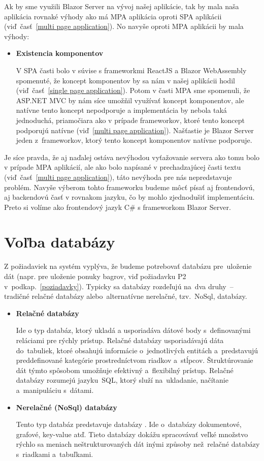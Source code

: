 Ak by sme využili Blazor Server na vývoj našej aplikácie, tak by mala naša aplikácia rovnaké výhody ako má MPA aplikácia oproti SPA aplikácii (viď~časť~\ref{multi page application}). No navyše oproti MPA aplikácii by mala výhody:

\begin{itemize}
\item \textbf{Existencia komponentov}

V SPA časti bolo v súvise s frameworkmi ReactJS a Blazor WebAssembly spomenuté, že koncept komponentov by sa nám v našej aplikácii hodil (viď~časť~\ref{single page application}). Potom v časti MPA sme spomenuli, že ASP.NET MVC by nám síce umožňil využívať koncept komponentov, ale natívne tento koncept nepodporuje a implementácia by nebola taká jednoduchá, priamočiara ako v prípade frameworkov, ktoré tento koncept podporujú natívne (viď~\ref{multi page application}). Našťastie je Blazor Server jeden z~frameworkov, ktorý tento koncept komponentov natívne podporuje.
\end{itemize}

Je síce pravda, že aj naďalej ostáva nevýhodou vyťažovanie servera ako tomu bolo v prípade MPA aplikácií, ale ako bolo napísané v prechadzajúcej časti textu (viď~časť~\ref{multi page application}), táto nevýhoda pre nás nepredstavuje problém. Navyše výberom tohto frameworku budeme môcť písať aj frontendovú, aj backendovú časť v rovnakom jazyku, čo by mohlo zjednodušiť implementáciu. Preto si volíme ako frontendový jazyk C\# s frameworkom Blazor Server.

\section{Voľba databázy}
\label{volba databazy}

Z požiadaviek na systém vyplýva, že budeme potrebovať databázu pre~uloženie dát (napr. pre uloženie ponuky bagrov, viď požiadavku P2 v~podkap.~\ref{poziadavky}). Typicky sa databázy rozdeľujú na~dva druhy~-- tradičné relačné databázy alebo~alternatívne nerelačné, tzv.~NoSql, databázy.

\begin{itemize}
\item \textbf{Relačné databázy~\cite{relational db}}

Ide o typ databáz, ktorý ukladá a usporiadáva dátové body s~definovanými reláciami pre rýchly prístup. Relačné databázy usporiadávajú dáta do~tabuliek, ktoré obsahujú informácie o~jednotlivých entitách a~predstavujú preddefinované kategórie prostredníctvom riadkov a~stĺpcov. Štruktúrovanie dát týmto spôsobom umožňuje efektivný a~flexibilný prístup. Relačné databázy rozumejú jazyku~SQL, ktorý služí na~ukladanie, načítanie a~manipuláciu s~dátami.

\item \textbf{Nerelačné (NoSql) databázy~\cite{nosql db}}

Tento typ databáz predstavuje databázy . Ide o~databázy dokumentové, grafové, key-value atď. Tieto databázy dokážu spracovávať veľké množstvo rýchlo sa meniach neštrukturovaných dát inými způsoby než~relačné databázy s~riadkami a~tabuľkami.
\end{itemize}

